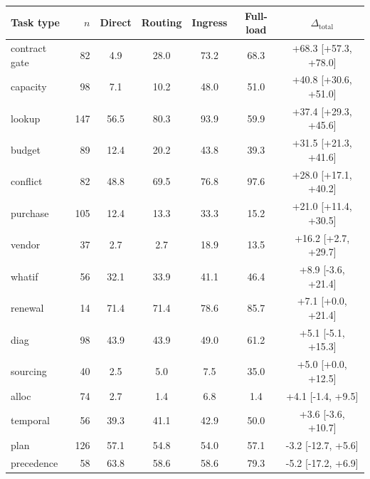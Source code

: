 \begin{tabular}{l r cccc c}
\toprule
Task type & $n$ & Direct & Routing & Ingress & Full-load & $\Delta_{\text{total}}$ \\
\midrule
contract gate & 82 & 4.9 & 28.0 & 73.2 & 68.3 & +68.3 [+57.3, +78.0] \\
capacity & 98 & 7.1 & 10.2 & 48.0 & 51.0 & +40.8 [+30.6, +51.0] \\
lookup & 147 & 56.5 & 80.3 & 93.9 & 59.9 & +37.4 [+29.3, +45.6] \\
budget & 89 & 12.4 & 20.2 & 43.8 & 39.3 & +31.5 [+21.3, +41.6] \\
conflict & 82 & 48.8 & 69.5 & 76.8 & 97.6 & +28.0 [+17.1, +40.2] \\
purchase & 105 & 12.4 & 13.3 & 33.3 & 15.2 & +21.0 [+11.4, +30.5] \\
vendor & 37 & 2.7 & 2.7 & 18.9 & 13.5 & +16.2 [+2.7, +29.7] \\
whatif & 56 & 32.1 & 33.9 & 41.1 & 46.4 & +8.9 [-3.6, +21.4] \\
renewal & 14 & 71.4 & 71.4 & 78.6 & 85.7 & +7.1 [+0.0, +21.4] \\
diag & 98 & 43.9 & 43.9 & 49.0 & 61.2 & +5.1 [-5.1, +15.3] \\
sourcing & 40 & 2.5 & 5.0 & 7.5 & 35.0 & +5.0 [+0.0, +12.5] \\
alloc & 74 & 2.7 & 1.4 & 6.8 & 1.4 & +4.1 [-1.4, +9.5] \\
temporal & 56 & 39.3 & 41.1 & 42.9 & 50.0 & +3.6 [-3.6, +10.7] \\
plan & 126 & 57.1 & 54.8 & 54.0 & 57.1 & -3.2 [-12.7, +5.6] \\
precedence & 58 & 63.8 & 58.6 & 58.6 & 79.3 & -5.2 [-17.2, +6.9] \\
\bottomrule
\end{tabular}